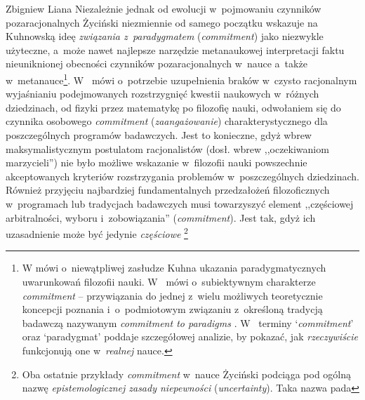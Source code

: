 \begin{artplenv}{Zbigniew Liana}
Niezależnie jednak od ewolucji w~pojmowaniu czynników pozaracjonalnych Życiński niezmiennie od samego początku wskazuje
na Kuhnowską ideę \textit{związania z~paradygmatem }(\textit{commitment}) jako niezwykle użyteczne, a~może nawet najlepsze
narzędzie metanaukowej interpretacji faktu nieuniknionej obecności czynników
pozaracjonalnych w~nauce a~także w~metanauce\footnote{W
\parencite[s.~153]{zycinski_jezyk_1983}
mówi o~niewątpliwej
zasłudze Kuhna ukazania paradygmatycznych uwarunkowań filozofii nauki.
W~\parencite[s.~160]{zycinski_teizm_1985}
mówi o~subiektywnym charakterze \textit{commitment} -- przywiązania do jednej z~wielu możliwych
teoretycznie koncepcji poznania i~o~podmiotowym związaniu z~określoną tradycją badawczą nazywanym \textit{commitment to
paradigms}
\parencite*[s.~164]{zycinski_teizm_1985}.
W~\parencite[s.~191–200]{zycinski_elementy_1996}
terminy `\textit{commitment}' oraz `paradygmat' poddaje szczegółowej analizie, by pokazać, jak
\textit{rzeczywiście} funkcjonują one w~\textit{realnej} nauce.}.
W~\parencites[s.~136n]{zycinski_structure_1988}[s.~241n]{zycinski_struktura_2013}
mówi o~potrzebie uzupełnienia braków w~czysto racjonalnym wyjaśnianiu
podejmowanych rozstrzygnięć kwestii naukowych w~różnych dziedzinach, od fizyki przez matematykę po filozofię nauki,
odwołaniem się do czynnika osobowego \textit{commitment} (\textit{zaangażowanie}) charakterystycznego dla poszczególnych
programów badawczych. Jest to konieczne, gdyż wbrew maksymalistycznym postulatom racjonalistów (dosł. wbrew
,,oczekiwaniom marzycieli'') nie było możliwe wskazanie w~filozofii nauki powszechnie akceptowanych kryteriów
rozstrzygania problemów w~poszczególnych dziedzinach. Również przyjęciu najbardziej fundamentalnych przedzałożeń
filozoficznych w~programach lub tradycjach badawczych musi towarzyszyć element ,,częściowej arbitralności,
wyboru i~zobowiązania'' (\textit{commitment}).
Jest tak, gdyż ich uzasadnienie może być jedynie \textit{częściowe}
\parencites[zob.][s.~143]{zycinski_structure_1988}[s.~253n]{zycinski_struktura_2013}\footnote{\label{lia-foo-55}Oba
ostatnie przykłady \textit{commitment} w~nauce
Życiński podciąga pod ogólną nazwę \textit{epistemologicznej zasady niepewności} (\textit{uncertainty}). Taka nazwa pada
}
\end{artplenv}
